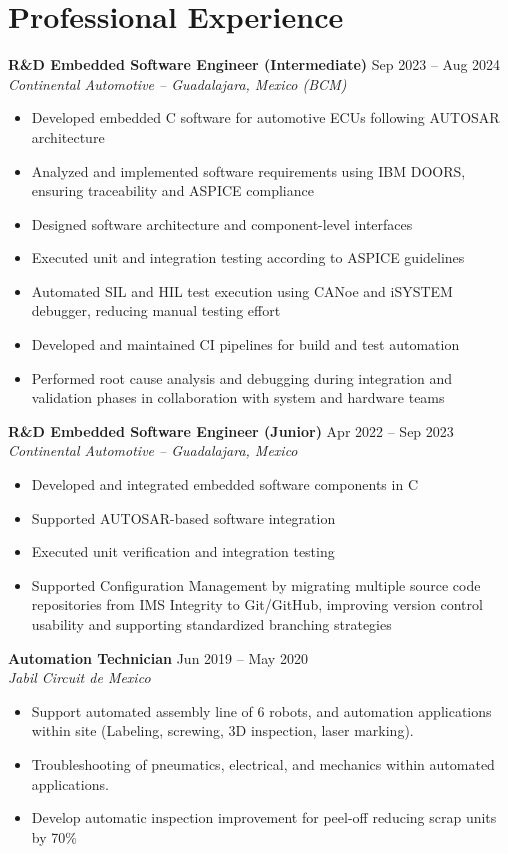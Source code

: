 \documentclass[10pt,a4paper]{article}
\newcommand{\resumeItem}[1]{
	\item \small{#1}
}
\begin{document}
\section{Professional Experience}
\textbf{R\&D Embedded Software Engineer (Intermediate)} \hfill Sep 2023 -- Aug 2024 \\
\textit{Continental Automotive – Guadalajara, Mexico (BCM)}
\begin{itemize}[leftmargin=*]
	\resumeItem{Developed embedded C software for automotive ECUs following AUTOSAR architecture}
	\resumeItem{Analyzed and implemented software requirements using IBM DOORS, ensuring traceability and ASPICE compliance}
	\resumeItem{Designed software architecture and component-level interfaces}
	\resumeItem{Executed unit and integration testing according to ASPICE guidelines}
	\resumeItem{Automated SIL and HIL test execution using CANoe and iSYSTEM debugger, reducing manual testing effort}
	\resumeItem{Developed and maintained CI pipelines for build and test automation}
	\resumeItem{Performed root cause analysis and debugging during integration and validation phases in collaboration with system and hardware teams}
\end{itemize}

\textbf{R\&D Embedded Software Engineer (Junior)} \hfill Apr 2022 -- Sep 2023 \\
\textit{Continental Automotive – Guadalajara, Mexico}
\begin{itemize}[leftmargin=*]
	\resumeItem{Developed and integrated embedded software components in C}
	\resumeItem{Supported AUTOSAR-based software integration}
	\resumeItem{Executed unit verification and integration testing}
	\resumeItem{Supported Configuration Management by migrating multiple source code repositories from IMS Integrity to Git/GitHub, improving version control usability and supporting standardized branching strategies}
\end{itemize}

\textbf{Automation Technician} \hfill Jun 2019 -- May 2020 \\
\textit{Jabil Circuit de Mexico}
\begin{itemize}[leftmargin=*]
	\resumeItem{Support automated assembly line of 6 robots, and automation applications within site (Labeling, screwing, 3D inspection, laser marking).}
	\resumeItem{Troubleshooting of pneumatics, electrical, and mechanics within automated applications.}
	\resumeItem{Develop automatic inspection improvement for peel-off reducing scrap units by 70\%}
\end{itemize}
\end{document}
